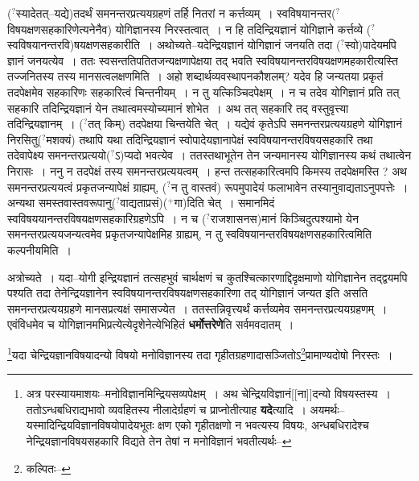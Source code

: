 \documentclass[article,12pt,a4paper]{memoir}
\newcommand{\unclear}[1]{($^{?}$#1)}
\newcommand{\add}[1]{($^{+}$#1)}
\begin{document}
	  \pstart \unclear{स्यादेतत्--यद्ये}तदर्थं समनन्तरप्रत्ययग्रहणं तर्हि नितरां न कर्त्तव्यम् । स्वविषयानन्तर\unclear{विषयक्षणसहकारिणेत्यनेनैव} योगिज्ञानस्य निरस्तत्वात् । न हि तदिन्द्रियज्ञानं योगिज्ञाने कर्त्तव्ये \unclear{स्वविषयानन्तरवि}षयक्षणसहकारीति । अथोच्यते--यदेन्द्रियज्ञानं योगिज्ञानं जनयति तदा \unclear{स्वो}पादेयमपि ज्ञानं जनयत्येव । ततः स्वसन्ततिपतितजन्यक्षणापेक्षया तद् भवति स्वविषयानन्तरविषयक्षणमहकारीत्यस्ति तज्जनितस्य तस्य मानसत्वलक्षणमिति । अहो शब्दार्थव्यवस्थापनकौशलम्? यदेव हि जन्यतया प्रकृतं तदपेक्षमेव सहकारिणः सहकारित्वं चिन्तनीयम् । न तु यत्किञ्चिदपेक्षम् । न च तदेव योगिज्ञानं प्रति तत् सहकारि तदिन्द्रियज्ञानं येन तथात्वमस्योच्यमानं शोभेत । अथ तत् सहकारि तद् वस्तुवृत्त्या तदिन्द्रियज्ञानम् । \unclear{तत् किम्} तदपेक्षया चिन्तयेति चेत् । यद्येवं कृतेऽपि समनन्तरप्रत्ययग्रहणे योगिज्ञानं निरसितु\unclear{मशक्यं} तथापि यथा तदिन्द्रियज्ञानं स्वोपादेयज्ञानापेक्षं स्वविषयानन्तरविषयसहकारि तथा तदेवापेक्ष्य समनन्तरप्रत्ययो\unclear{ऽ}प्यदो भ\leavevmode{}वत्येव । ततस्तथाभूतेन तेन जन्यमानस्य योगिज्ञानस्य कथं तथात्वेन निरासः । ननु न तदपेक्षं तस्य समनन्तरप्रत्ययत्वम् । हन्त तत्सहकारित्वमपि किमस्य तदपेक्षमस्ति ? अथ समनन्तरप्रत्ययत्वं प्रकृतजन्यापेक्षं ग्राह्यम्, \unclear{न तु वास्तवं} रूपमुपादेयं फलाभावेन तस्यानुवाद्यताऽनुपपत्तेः । अन्यथा समस्तवास्तवरूपानु\unclear{वाद्यताप्रसं}\add{गा}दिति चेत् । समानमिदं स्वविषययानन्तरविषयक्षणसहकारिग्रहणेऽपि । न च \unclear{राजशासनस}मानं किञ्चिदुत्पश्यामो येन समनन्तरप्रत्ययजन्यत्वमेव प्रकृतजन्यापेक्षमिह ग्राह्यम्, न तु स्वविषयानन्तरविषयक्षणसहकारित्वमिति कल्पनीयमिति ।
	\pend
      

	  \pstart अत्रोच्यते । यदा--योगी इन्द्रियज्ञानं तत्सहभुवं चार्थक्षणं च कुतश्चित्कारणाद्दिदृक्षमाणो योगिज्ञानेन तद्द्वयमपि पश्यति तदा तेनेन्द्रियज्ञानेन स्वविषयानन्तरविषयक्षणसहकारिणा तद् योगिज्ञानं जन्यत इति असति समनन्तरप्रत्ययग्रहणे मानसप्रत्यक्षं समासज्येत । ततस्तन्निवृत्त्यर्थं कर्त्तव्यमेव समनन्तरप्रत्ययग्रहणम् । एवंविधमेव च योगिज्ञानमभिप्रत्येत्येदृशेनेत्येभिहितं \textbf{धर्मोत्तरेणे}ति सर्वमवदातम् ।
	\pend
	  \bigskip
	  \begingroup
	

	  \pstart \footnote{अत्र परस्यायमाशयः--मनोविज्ञानमिन्द्रियसव्यपेक्षम् । अथ चेन्द्रियविज्ञानं[[ना]]दन्यो विषयस्तस्य । ततोऽन्धबधिराद्यभावो व्यवहितस्य नीलादेर्ग्रहणं च प्राप्नोतीत्याह \textbf{यदे}त्यादि । अयमर्थः--यस्मादिन्द्रियविज्ञानविषयोपादेयभूतः क्षण एको गृहीतक्षणो न भवत्यस्य विषयः, अन्धबधिरादेश्च नेन्द्रियज्ञानविषयसहकारि विद्यते तेन तेषां न मनोविज्ञानं भवतीत्यर्थः--\cite{dp-msD-n}}\-यदा चेन्द्रियज्ञानविषयादन्यो विषयो मनोविज्ञानस्य तदा गृहीतग्रहणादासञ्जितोऽ\footnote{कल्पितः--\cite{dp-msD-n}}प्रामाण्यदोषो निरस्तः ।
	\pend
       
\end{document}
